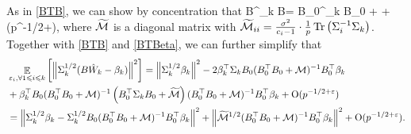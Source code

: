 As in \eqref{BTB}, we can show by concentration that 
\be\label{BTB2}
B^\top \Sigma_k B=  B_0^\top \Sigma_k B_0 + +\OO(\sigma p^{-1/2+\e}),
\ee
where $\widetilde{\mathcal M}$ is a diagonal matrix with $\widetilde{\mathcal M}_{ii}=\frac{\sigma^2}{c_i-1}\cdot \frac1p\operatorname{Tr} \left(\Sigma_i^{-1}\Sigma_k\right)$. Together with \eqref{BTB} and \eqref{BTBeta}, we can further simplify that
\begin{align*}
&\mathop{\mathbb{E}}_{\varepsilon_i, \forall 1\leqslant i\leqslant k}\left[ \left\|\Sigma_k^{1/2} (B\hat W_k -\beta_k)\right\|^2 \right]= \left\|\Sigma_k^{1/2} \beta_k\right\|^2 - 2\beta_k^\top \Sigma_k B_0 (B_0^\top B_0 +\mathcal M)^{-1} B_0^\top \beta_k  \\
&+ \beta_k^\top B_0 (B_0^\top B_0 +\mathcal M)^{-1} \left(B_0^\top \Sigma_k B_0 + \widetilde{\mathcal M}\right) (B_0^\top B_0 + {\mathcal M})^{-1}  B_0^\top \beta_k+ \operatorname{O}(p^{-1/2+{\varepsilon}})\\
& = \left\|\Sigma_k^{1/2} \beta_k - \Sigma_k^{1/2} B_0(B_0^\top B_0 +\mathcal M)^{-1} B_0^\top \beta_k \right\|^2  + \left\|\widetilde{\mathcal M}^{1/2}(B_0^\top B_0 + {\mathcal M})^{-1}  B_0^\top \beta_k \right\|^2+ \operatorname{O}(p^{-1/2+{\varepsilon}}).
\end{align*}

